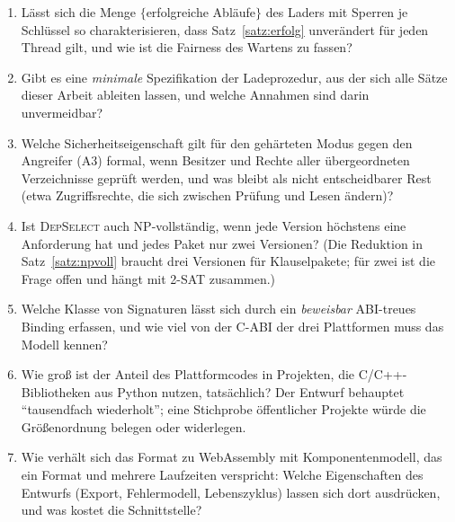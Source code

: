 \begin{enumerate}
	\item Lässt sich die Menge $\{$erfolgreiche Abläufe$\}$ des Laders mit Sperren je Schlüssel so charakterisieren, dass Satz~\ref{satz:erfolg} unverändert für jeden Thread gilt, und wie ist die Fairness des Wartens zu fassen?
	\item Gibt es eine \emph{minimale} Spezifikation der Ladeprozedur, aus der sich alle Sätze dieser Arbeit ableiten lassen, und welche Annahmen sind darin unvermeidbar?
	\item Welche Sicherheitseigenschaft gilt für den gehärteten Modus gegen den Angreifer (A3) formal, wenn Besitzer und Rechte aller übergeordneten Verzeichnisse geprüft werden, und was bleibt als nicht entscheidbarer Rest (etwa Zugriffsrechte, die sich zwischen Prüfung und Lesen ändern)?
	\item Ist \textsc{DepSelect} auch NP-vollständig, wenn jede Version höchstens eine Anforderung hat und jedes Paket nur zwei Versionen? (Die Reduktion in Satz~\ref{satz:npvoll} braucht drei Versionen für Klauselpakete; für zwei ist die Frage offen und hängt mit 2-SAT zusammen.)
	\item Welche Klasse von Signaturen lässt sich durch ein \emph{beweisbar} ABI-treues Binding erfassen, und wie viel von der C-ABI der drei Plattformen muss das Modell kennen?
	\item Wie groß ist der Anteil des Plattformcodes in Projekten, die C/C++-Bibliotheken aus Python nutzen, tatsächlich? Der Entwurf behauptet ``tausendfach wiederholt''; eine Stichprobe öffentlicher Projekte würde die Größenordnung belegen oder widerlegen.
	\item Wie verhält sich das Format zu WebAssembly mit Komponentenmodell, das ein Format und mehrere Laufzeiten verspricht: Welche Eigenschaften des Entwurfs (Export, Fehlermodell, Lebenszyklus) lassen sich dort ausdrücken, und was kostet die Schnittstelle?
\end{enumerate}

